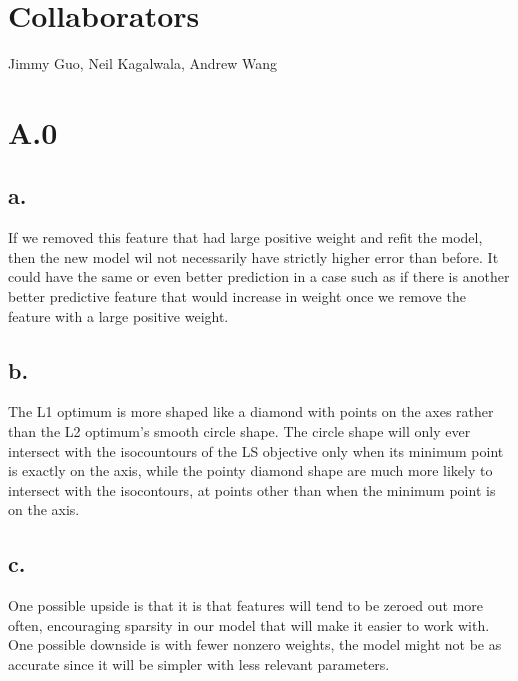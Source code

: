 \documentclass{article}
\date{{}}
\newcommand{\1}{\mathbf{1}}
\begin{document}
\thispagestyle{firstpageheader}

\section*{Collaborators}
{\Large 
Jimmy Guo, Neil Kagalwala, Andrew Wang
}

\section*{A.0}
{\Large 

\subsection*{a.}

If we removed this feature that had large positive weight and refit the model, then the new model wil not necessarily have strictly higher error than before. It could have the same or even better prediction in a case such as if there is another better predictive feature that would increase in weight once we remove the feature with a large positive weight.

\subsection*{b.}

The L1 optimum is more shaped like a diamond with points on the axes rather than the L2 optimum's smooth circle shape. The circle shape will only ever intersect with the isocountours of the LS objective only when its minimum point is exactly on the axis, while the pointy diamond shape are much more likely to intersect with the isocontours, at points other than when the minimum point is on the axis.

\subsection*{c.}

One possible upside is that it is that features will tend to be zeroed out more often, encouraging sparsity in our model that will make it easier to work with. \\ 
One possible downside is with fewer nonzero weights, the model might not be as accurate since it will be simpler with less relevant parameters.

}
\end{document}
